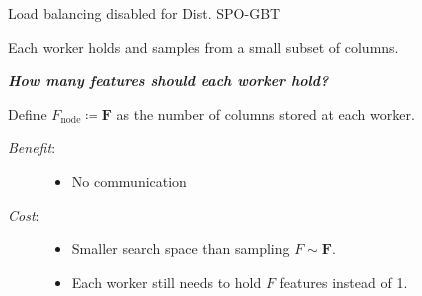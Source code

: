 \documentclass[sigconf,screen]{acmart}
\begin{document}

Load balancing disabled for Dist. SPO-GBT


Each worker holds and samples from a small subset of columns.

\textbf{\textit{How many features should each worker hold?}}

Define $F_{\text{node}} \coloneqq \mathbf{F}$ as the number of columns stored at each worker.



\begin{description}
    \item[\textit{Benefit}:]
    \begin{itemize}
        \item No communication
    \end{itemize}
\end{description}

\begin{description}
    \item[\textit{Cost}:]
    \begin{itemize}
        \item Smaller search space than sampling $F \sim \mathbf{F}$.
        \item Each worker still needs to hold $F$ features instead of 1.
    \end{itemize}
\end{description}
\end{document}
